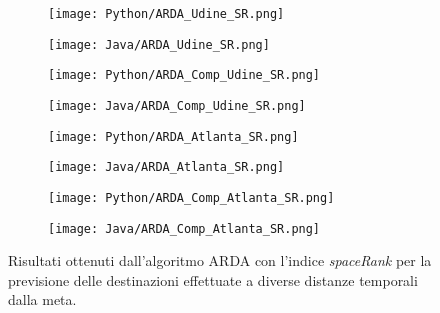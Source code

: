 \begin{figure}[!ht]
    \begin{center}
    \begin{subfigure}[a.1]{0.45\textwidth}
        \texttt{[image: Python/ARDA\_Udine\_SR.png]} \caption{}
    \end{subfigure}
    \begin{subfigure}[a.2]{0.45\textwidth}
        \texttt{[image: Java/ARDA\_Udine\_SR.png]} \caption{}
    \end{subfigure}
    \begin{subfigure}[b.1]{0.45\textwidth}
        \texttt{[image: Python/ARDA\_Comp\_Udine\_SR.png]} \caption{}
    \end{subfigure}
    \begin{subfigure}[b.2]{0.45\textwidth}
        \texttt{[image: Java/ARDA\_Comp\_Udine\_SR.png]} \caption{}
    \end{subfigure}
    \begin{subfigure}[c.1]{0.45\textwidth}
        \texttt{[image: Python/ARDA\_Atlanta\_SR.png]} \caption{}
    \end{subfigure}
    \vspace{0.5cm}
    \begin{subfigure}[c.2]{0.45\textwidth}
        \texttt{[image: Java/ARDA\_Atlanta\_SR.png]} \caption{}
    \end{subfigure}
    \begin{subfigure}[d.1]{0.45\textwidth}
        \texttt{[image: Python/ARDA\_Comp\_Atlanta\_SR.png]} \caption{}
    \end{subfigure}
    \begin{subfigure}[d.2]{0.45\textwidth}
        \texttt{[image: Java/ARDA\_Comp\_Atlanta\_SR.png]} \caption{}
    \end{subfigure}
    \caption[ARDA_1_SR]{
    Risultati ottenuti dall'algoritmo ARDA con l'indice \textit{spaceRank} per la
    previsione delle destinazioni effettuate a diverse distanze temporali dalla meta.
    }
    \label{etichetta}
    \end{center}
\end{figure}

\clearpage
